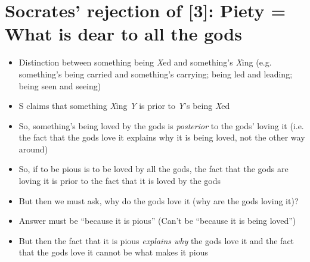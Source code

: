 \documentclass[11pt]{article}
\begin{document}
\section*{Socrates' rejection of [3]: Piety = What is dear to all the gods}
\begin{itemize}
\item{Distinction between something being \emph{X}ed and something's \emph{X}ing (e.g. something's being carried and something's carrying; being led and leading; being seen and seeing)}

\item{S claims that something \emph{X}ing \emph{Y} is prior to \emph{Y}'s being \emph{X}ed}

\item{So, something's being loved by the gods is \emph{posterior} to the gods' loving it (i.e. the fact that the gods love it explains why it is being loved, not the other way around)}

\item{So, if to be pious is to be loved by all the gods, the fact that the gods are loving it is prior to the fact that it is loved by the gods}

\item{But then we must ask, why do the gods love it (why are the gods loving it)?}

\item{Answer must be ``because it is pious'' (Can't be ``because it is being loved'')}

\item{But then the fact that it is pious \emph{explains why} the gods love it and the fact that the gods love it cannot be what makes it pious}

\end{itemize}
\end{document}
